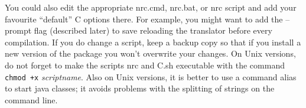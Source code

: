\begin{enumerate}
You could also edit the appropriate nrc.cmd, nrc.bat, or nrc script
and add your favourite “default” \nr{}C options there. For example,
you might want to add the –prompt flag (described later) to save
reloading the translator before every compilation. If you do change a
script, keep a backup copy so that if you install a new version of the
\nr{} package you won’t overwrite your changes. On Unix versions, do
not forget to make the scripts nrc and \nr{}C.sh executable with the
command \texttt{chmod +x} \emph{scriptname}. Also on Unix versions, it
is better to use a command alias to start java classes; it avoids
problems with the splitting of strings on the command line.
\end{enumerate}